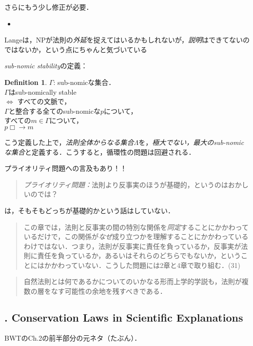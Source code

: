 \documentclass[dvipdfmx,twoside,11pt,uplatex]{jsarticle}
\theoremstyle{definition}
\newtheorem{dfn}{Definition}
\begin{document}
さらにもう少し修正が必要．
\begin{itemize}
    \item 
\end{itemize}

Langeは，NPが法則の\emph{外延}を捉えてはいるかもしれないが，\emph{説明}はできてないのではないか，という点にちゃんと気づいている\citep[Sect.1,6]{Lange2009lawmakers}

\emph{sub-nomic stability}の定義\citep[29]{Lange2009lawmakers}：
\begin{dfn}
    $\Gamma$: sub-nomicな集合．\\
    $\Gamma$はsub-nomically stable\\
    $\Longleftrightarrow$ すべての文脈で，\\
    $\Gamma$と整合する全てのsub-nomicな$p$について，\\
    すべての$m\in\Gamma$について，\\
    $p\Box\rightarrow m$
\end{dfn}
こう定義した上で，\emph{法則全体からなる集合}$\Lambda$を，\emph{極大でない，最大のsub-nomicな集合}と定義する．こうすると，循環性の問題は回避される．

プライオリティ問題への言及もあり！！
\begin{quote}
    \emph{プライオリティ問題：}法則より反事実のほうが基礎的，というのはおかしいのでは？
\end{quote}
\citet[31]{Lange2009lawmakers}は，そもそもどっちが基礎的かという話はしていない．
\begin{quote}
    この章では，法則と反事実の間の特別な関係を\emph{同定}することにかかわっているだけで，この関係が\emph{なぜ}成り立つかを理解することにかかわっているわけではない．つまり，法則が反事実に責任を負っているか，反事実が法則に責任を負っているか，あるいはそれらのどちらでもないか，ということにはかかわっていない．こうした問題には2章と4章で取り組む．(31)
\end{quote}

\begin{quote}
    自然法則とは何であるかについてのいかなる形而上学的学説も，法則が複数の層をなす可能性の余地を残すべきである．\citep[41]{Lange2009lawmakers}
\end{quote}

\subsection{\cite{Lange2011}. Conservation Laws in Scientific Explanations}
BWTのCh.2の前半部分の元ネタ（たぶん）．
\end{document}
